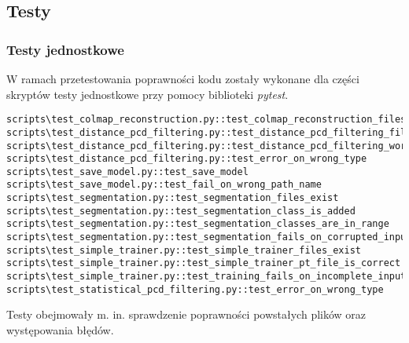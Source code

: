 \subsection{Testy}

\subsubsection{Testy jednostkowe}
W ramach przetestowania poprawności kodu zostały wykonane dla części skryptów testy jednostkowe przy pomocy biblioteki \textit{pytest}.

\lstset{style=basicstyle}
\begin{lstlisting}
scripts\test_colmap_reconstruction.py::test_colmap_reconstruction_files_exist 
scripts\test_distance_pcd_filtering.py::test_distance_pcd_filtering_files_exist 
scripts\test_distance_pcd_filtering.py::test_distance_pcd_filtering_works 
scripts\test_distance_pcd_filtering.py::test_error_on_wrong_type 
scripts\test_save_model.py::test_save_model 
scripts\test_save_model.py::test_fail_on_wrong_path_name 
scripts\test_segmentation.py::test_segmentation_files_exist 
scripts\test_segmentation.py::test_segmentation_class_is_added 
scripts\test_segmentation.py::test_segmentation_classes_are_in_range 
scripts\test_segmentation.py::test_segmentation_fails_on_corrupted_input 
scripts\test_simple_trainer.py::test_simple_trainer_files_exist 
scripts\test_simple_trainer.py::test_simple_trainer_pt_file_is_correct 
scripts\test_simple_trainer.py::test_training_fails_on_incomplete_input 
scripts\test_statistical_pcd_filtering.py::test_error_on_wrong_type 
\end{lstlisting}

Testy obejmowały m. in. sprawdzenie poprawności powstałych plików oraz występowania błędów. 
